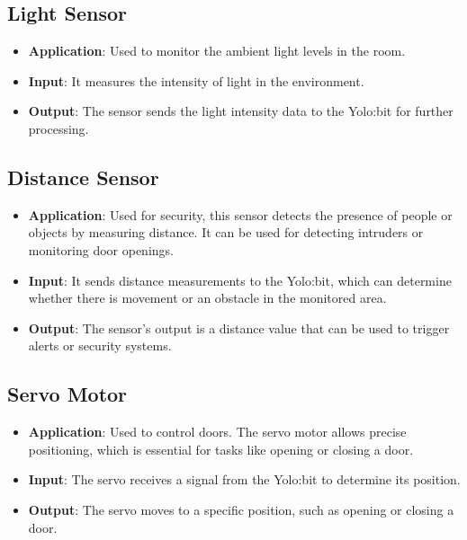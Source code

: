 \subsection{Light Sensor}

\begin{itemize}
    \item \textbf{Application}: Used to monitor the ambient light levels in the room.
    \item \textbf{Input}: It measures the intensity of light in the environment.
    \item \textbf{Output}: The sensor sends the light intensity data to the Yolo:bit for further processing.
\end{itemize}

\subsection{Distance Sensor}

\begin{itemize}
    \item \textbf{Application}: Used for security, this sensor detects the presence of people or objects by measuring distance. It can be used for detecting intruders or monitoring door openings.
    \item \textbf{Input}: It sends distance measurements to the Yolo:bit, which can determine whether there is movement or an obstacle in the monitored area.
    \item \textbf{Output}: The sensor’s output is a distance value that can be used to trigger alerts or security systems.
\end{itemize}
    
\subsection{Servo Motor}

\begin{itemize}
    \item \textbf{Application}: Used to control doors. The servo motor allows precise positioning, which is essential for tasks like opening or closing a door.
    \item \textbf{Input}: The servo receives a signal from the Yolo:bit to determine its position.
    \item \textbf{Output}: The servo moves to a specific position, such as opening or closing a door.
\end{itemize}
    

